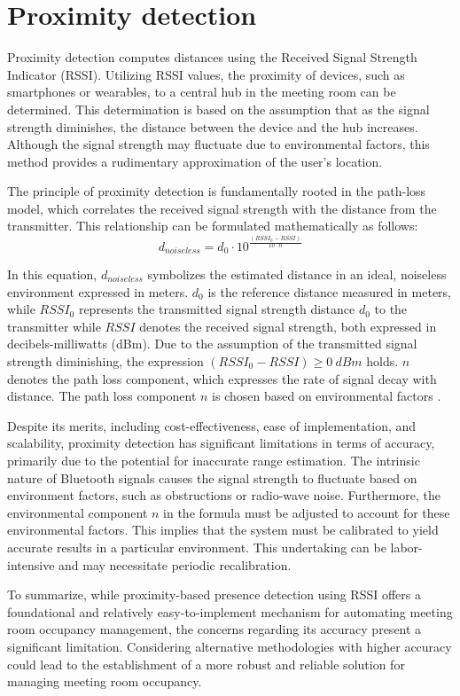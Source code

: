 \section{Proximity detection}\label{sec:proximity_detection}
Proximity detection computes distances using the Received Signal Strength Indicator (RSSI).
Utilizing RSSI values, the proximity of devices, such as smartphones or wearables, to a central hub in the meeting room can be determined. 
This determination is based on the assumption that as the signal strength diminishes, the distance between the device and the hub increases. 
Although the signal strength may fluctuate due to environmental factors, this method provides a rudimentary approximation of the user's location.\cite{spachosBLEBeaconsIndoor2020}

The principle of proximity detection is fundamentally rooted in the path-loss model, which correlates the received signal strength with the distance from the transmitter. This relationship can be formulated mathematically as follows:\cite{spachosBLEBeaconsIndoor2020}
$$
d_{noiseless} = d_0 \cdot 10^{ \frac{(RSSI_{0} - RSSI)}{10 \cdot n}}
$$

In this equation, \(d_{noiseless}\) symbolizes the estimated distance in an ideal, noiseless environment expressed in meters.
$d_0$ is the reference distance measured in meters, while \(RSSI_{0}\) represents the transmitted signal strength distance $d_0$ to the transmitter while \(RSSI\) denotes the received signal strength, both expressed in decibels-milliwatts (dBm). 
Due to the assumption of the transmitted signal strength diminishing, the expression $(RSSI_{0} - RSSI) \geq 0\ dBm$ holds. 
\(n\) denotes the path loss component, which expresses the rate of signal decay with distance.  
The path loss component \(n\) is chosen based on environmental factors \cite{spachosBLEBeaconsIndoor2020}. 

Despite its merits, including cost-effectiveness, ease of implementation, and scalability, proximity detection has significant limitations in terms of accuracy, primarily due to the potential for inaccurate range estimation. 
The intrinsic nature of Bluetooth signals causes the signal strength to fluctuate based on environment factors, such as obstructions or radio-wave noise.\cite{spachosBLEBeaconsIndoor2020}
Furthermore, the environmental component $n$ in the formula must be adjusted to account for these environmental factors. 
This implies that the system must be calibrated to yield accurate results in a particular environment. This undertaking can be labor-intensive and may necessitate periodic recalibration.\cite{spachosBLEBeaconsIndoor2020}

To summarize, while proximity-based presence detection using RSSI offers a foundational and relatively easy-to-implement mechanism for automating meeting room occupancy management, the concerns regarding its accuracy present a significant limitation. 
Considering alternative methodologies with higher accuracy could lead to the establishment of a more robust and reliable solution for managing meeting room occupancy.
